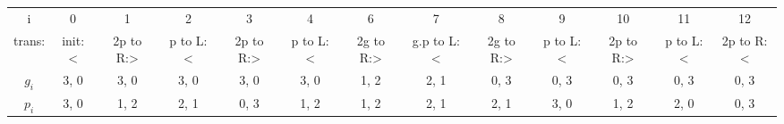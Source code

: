 \begin{tabular}{ c c c c c c c c c c c c c }
    i & 0 & 1 & 2 & 3 & 4 & 6 & 7 & 8 & 9 & 10 & 11 & 12 \\ 
    trans: & init:< & 2p to R:> & p to L:< & 2p to R:> & p to L:< & 2g to R:> & g.p to L:< & 2g to R:> & p to L:< & 2p to R:> & p to L:< & 2p to R:< \\ 
    $g_i$ & 3, 0 & 3, 0 & 3, 0 & 3, 0 & 3, 0 & 1, 2 & 2, 1 & 0, 3 & 0, 3 & 0, 3 & 0, 3 & 0, 3 \\ 
    $p_i$ & 3, 0 & 1, 2 & 2, 1 & 0, 3 & 1, 2 & 1, 2 & 2, 1 & 2, 1 & 3, 0 & 1, 2 & 2, 0 & 0, 3 \\ 
\end{tabular}